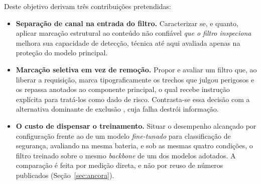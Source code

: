 Deste objetivo derivam três contribuições pretendidas:

\begin{itemize}
  \item \textbf{Separação de canal na entrada do filtro.} Caracterizar se, e
  quanto, aplicar marcação estrutural \cite{hines2024spotlighting} ao conteúdo
  não confiável \textit{que o filtro inspeciona} melhora sua capacidade de
  detecção, técnica até aqui avaliada apenas na proteção do modelo principal.
  \item \textbf{Marcação seletiva em vez de remoção.} Propor e avaliar um filtro
  que, ao liberar a requisição, marca tipograficamente os trechos que julgou
  perigosos e os repassa anotados ao componente principal, o qual recebe
  instrução explícita para tratá-los como dado de risco. Contrasta-se essa
  decisão com a alternativa dominante de exclusão \cite{shi2025promptarmor,
  wang2025datafilter, geng2025pisanitizer}, cuja falha destrói informação.
  \item \textbf{O custo de dispensar o treinamento.} Situar o desempenho
  alcançado por configuração frente ao de um modelo \textit{fine-tunado} para
  classificação de segurança, avaliando na mesma bateria, e sob as mesmas
  quatro condições, o filtro treinado sobre o mesmo \textit{backbone} de um dos
  modelos adotados. A comparação é feita por medição
  direta, e não por reuso de números publicados (Seção~\ref{sec:ancora}).
\end{itemize}
